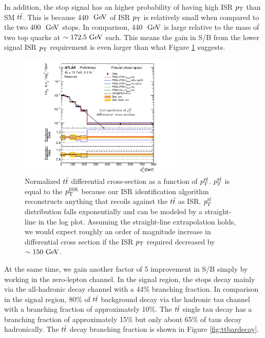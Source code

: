 \indent In addition, the stop signal has an higher probability of having high ISR $p_{\mathrm{T}}$ than SM $\ttbar$.  This is because 440 $\gev$ of ISR $p_{\mathrm{T}}$ is relatively small when compared to the two 400 $\gev$ stops.  In comparison, 440 $\gev$ is large relative to the mass of two top quarks at $\sim172.5 \gev$ each.  This means the gain in S/B from the lower signal ISR $p_{\mathrm{T}}$ requirement is even larger than what Figure \ref{fig:ttbar:ttpt} suggests.  \\

\begin{figure}[h!]
  \centering
	\includegraphics[width=0.70\textwidth]{./figures/strategy/ttbar_pt.png}
	\caption[Normalized $\ttbar$ differential cross section as a function of $p_T^{t\tbar}$]{Normalized $\ttbar$ differential cross-section as a function of $p_T^{t\tbar}$.\cite{ttbarDiffCross}  $p_T^{t\tbar}$ is equal to the $p_{\mathrm{T}}^{\mathrm{ISR}}$ because our ISR identification algorithm reconstructs anything that recoils against the $\ttbar$ as ISR.  $p_T^{t\tbar}$ distribution falls exponentially and can be modeled by a straight-line in the log plot.  Assuming the straight-line extrapolation holds, we would expect roughly an order of magnitude increase in differential cross section if the ISR $p_{\mathrm{T}}$ required decreased by $\sim150 \gev$.  }
\label{fig:ttbar:ttpt}
\end{figure}

\indent At the same time, we gain another factor of 5 improvement in S/B simply by working in the zero-lepton channel.  In the signal region, the stops decay mainly via the all-hadronic decay channel with a 44\% branching fraction.  In comparison in the signal region, 80\% of $\ttbar$ background decay via the hadronic tau channel with a branching fraction of approximately 10\%.  The $\ttbar$ single tau decay has a branching fraction of approximately 15\% but only about 65\% of taus decay hadronically. The $\ttbar$ decay branching fraction is shown in Figure \ref{fig:ttbardecay}.\\


